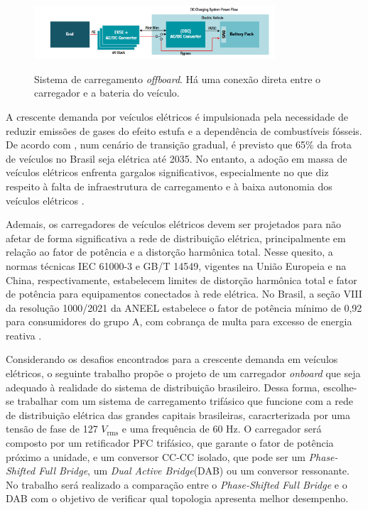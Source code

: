 \begin{figure}[htb]
    \centering
    \caption{Sistema de carregamento \textit{offboard}. Há uma conexão direta entre o
        carregador e a bateria do veículo.}
    \includegraphics[width=0.8\textwidth]{Figuras/diagrama_bypass.png}
    \label{fig:diagrama-bypass-offboard}

\end{figure}

A crescente demanda por veículos elétricos é impulsionada pela necessidade de reduzir emissões
de gases do efeito estufa e a dependência de combustíveis fósseis. De acordo com
\cite{anfavea2024descarbonizacao}, num cenário de transição gradual, é previsto que 65\% da
frota de veículos no Brasil seja elétrica até 2035. No entanto, a adoção em massa de veículos
elétricos enfrenta gargalos significativos, especialmente no que diz respeito à falta de
infraestrutura de carregamento e à baixa autonomia dos veículos elétricos \cite{Karneddi:2021}.

Ademais, os carregadores de veículos elétricos devem ser projetados para não afetar de forma
significativa a rede de distribuição elétrica, principalmente em relação ao fator de potência e
a distorção harmônica total. Nesse quesito, a normas técnicas IEC 61000-3 e GB/T 14549,
vigentes na União Europeia e na China, respectivamente, estabelecem limites de distorção
harmônica total e fator de potência para equipamentos conectados à rede elétrica. No Brasil, a
seção VIII da resolução 1000/2021 da ANEEL estabelece o fator de potência mínimo de 0,92 para
consumidores do grupo A, com cobrança de multa para excesso de energia reativa
\cite{aneel_ren1000_2021}.

Considerando os desafios encontrados para a crescente demanda em veículos elétricos, o seguinte
trabalho propõe o projeto de um carregador \textit{onboard} que seja adequado à realidade do
sistema de distribuição brasileiro. Dessa forma, escolhe-se trabalhar com um sistema de
carregamento trifásico que funcione com a rede de distribuição elétrica das grandes capitais
brasileiras, caracrterizada por uma tensão de fase de 127 \(V_{\mathrm{rms}}\) e uma frequência
de 60 Hz. O carregador será composto por um retificador PFC trifásico, que garante o fator de
potência próximo a unidade, e um conversor CC-CC isolado, que pode ser um \textit{Phase-Shifted
    Full Bridge}, um \textit{Dual Active Bridge}(DAB) ou um conversor ressonante. No trabalho será
realizado a comparação entre o \textit{Phase-Shifted Full Bridge} e o DAB com o objetivo de
verificar qual topologia apresenta melhor desempenho.

